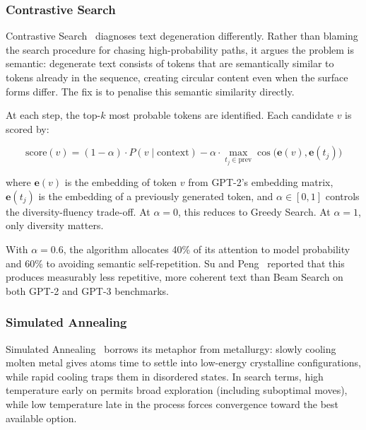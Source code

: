 \documentclass[12pt]{article}
\begin{document}
	\subsubsection{Contrastive Search}
	\label{sec:contrastive_theory}
	
	Contrastive Search~\cite{su2022contrastive} diagnoses text degeneration differently. Rather than blaming the search procedure for chasing high-probability paths, it argues the problem is semantic: degenerate text consists of tokens that are semantically similar to tokens already in the sequence, creating circular content even when the surface forms differ. The fix is to penalise this semantic similarity directly.
	
	At each step, the top-$k$ most probable tokens are identified. Each candidate $v$ is scored by:
	
	\begin{equation}
		\mathrm{score}(v) = (1-\alpha) \cdot P(v \mid \text{context})
		- \alpha \cdot \max_{t_j \in \text{prev}} \cos\bigl(\mathbf{e}(v), \mathbf{e}(t_j)\bigr)
		\label{eq:contrastive}
	\end{equation}
	
	where $\mathbf{e}(v)$ is the embedding of token $v$ from GPT-2's embedding matrix, $\mathbf{e}(t_j)$ is the embedding of a previously generated token, and $\alpha \in [0,1]$ controls the diversity-fluency trade-off. At $\alpha = 0$, this reduces to Greedy Search. At $\alpha = 1$, only diversity matters.
	
	With $\alpha = 0.6$, the algorithm allocates 40\% of its attention to model probability and 60\% to avoiding semantic self-repetition. Su and Peng~\cite{su2023contrastive_tacl} reported that this produces measurably less repetitive, more coherent text than Beam Search on both GPT-2 and GPT-3 benchmarks.
	
	\subsubsection{Simulated Annealing}
	\label{sec:sa_theory}
	
	Simulated Annealing~\cite{kirkpatrick1983annealing} borrows its metaphor from metallurgy: slowly cooling molten metal gives atoms time to settle into low-energy crystalline configurations, while rapid cooling traps them in disordered states. In search terms, high temperature early on permits broad exploration (including suboptimal moves), while low temperature late in the process forces convergence toward the best available option.
	
\end{document}
